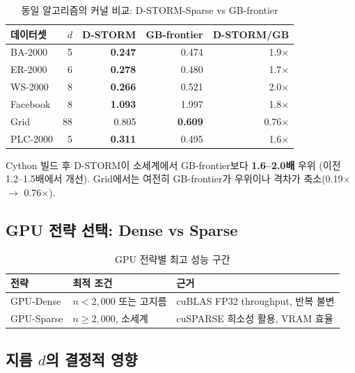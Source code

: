 \documentclass[11pt,a4paper]{article}
\begin{document}
\begin{table}[H]\centering
\caption{동일 알고리즘의 커널 비교: D-STORM-Sparse vs GB-frontier}
\small
\begin{tabular}{@{}lrrrr@{}}
\toprule
\textbf{데이터셋} & $d$ & \textbf{D-STORM} & \textbf{GB-frontier} & \textbf{D-STORM/GB} \\
\midrule
BA-2000 & 5 & \textbf{0.247} & 0.474 & 1.9$\times$ \\
ER-2000 & 6 & \textbf{0.278} & 0.480 & 1.7$\times$ \\
WS-2000 & 8 & \textbf{0.266} & 0.521 & 2.0$\times$ \\
Facebook & 8 & \textbf{1.093} & 1.997 & 1.8$\times$ \\
\rowcolor{gridwarn!10} Grid & 88 & 0.805 & \textbf{0.609} & 0.76$\times$ \\
PLC-2000 & 5 & \textbf{0.311} & 0.495 & 1.6$\times$ \\
\bottomrule
\end{tabular}
\end{table}

Cython 빌드 후 D-STORM이 소세계에서 GB-frontier보다 \textbf{1.6--2.0배} 우위 (이전 1.2--1.5배에서 개선). Grid에서는 여전히 GB-frontier가 우위이나 격차가 축소(0.19$\times$ $\to$ 0.76$\times$).

\subsection{GPU 전략 선택: Dense vs Sparse}

\begin{table}[H]\centering
\caption{GPU 전략별 최고 성능 구간}
\small
\begin{tabular}{@{}lll@{}}
\toprule
\textbf{전략} & \textbf{최적 조건} & \textbf{근거} \\
\midrule
GPU-Dense & $n < 2{,}000$ 또는 고지름 & cuBLAS FP32 throughput, 반복 불변 \\
GPU-Sparse & $n \geq 2{,}000$, 소세계 & cuSPARSE 희소성 활용, VRAM 효율 \\
\bottomrule
\end{tabular}
\end{table}

\subsection{지름 $d$의 결정적 영향}
\end{document}
